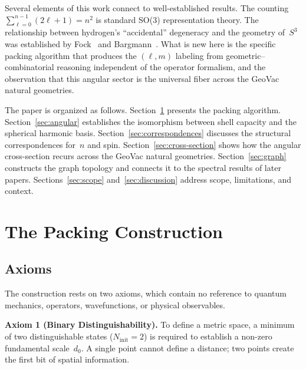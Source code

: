 \documentclass[aps,prl,reprint,amsmath,amssymb]{revtex4-2}
\begin{document}
\medskip

Several elements of this work connect to well-established results.
The counting $\sum_{\ell=0}^{n-1}(2\ell+1) = n^2$ is standard SO(3)
representation theory.  The relationship between hydrogen's
``accidental'' degeneracy and the geometry of~$S^3$ was established by
Fock~\cite{fock1935} and Bargmann~\cite{bargmann1936}.  What is new
here is the specific packing algorithm that produces the $(\ell, m)$
labeling from geometric--combinatorial reasoning independent of the
operator formalism, and the observation that this angular sector is
the universal fiber across the GeoVac natural geometries.

The paper is organized as follows.
Section~\ref{sec:construction} presents the packing algorithm.
Section~\ref{sec:angular} establishes the isomorphism between shell
capacity and the spherical harmonic basis.
Section~\ref{sec:correspondences} discusses the structural
correspondences for~$n$ and spin.
Section~\ref{sec:cross-section} shows how the angular cross-section
recurs across the GeoVac natural geometries.
Section~\ref{sec:graph} constructs the graph topology and connects it
to the spectral results of later papers.
Sections~\ref{sec:scope} and~\ref{sec:discussion} address scope,
limitations, and context.


\section{The Packing Construction}
\label{sec:construction}

\subsection{Axioms}

The construction rests on two axioms, which contain no reference to
quantum mechanics, operators, wavefunctions, or physical observables.

\medskip

\noindent\textbf{Axiom 1 (Binary Distinguishability).}
To define a metric space, a minimum of two distinguishable states
($N_{\mathrm{init}} = 2$) is required to establish a non-zero
fundamental scale~$d_0$.  A single point cannot define a distance; two
points create the first bit of spatial information.

\medskip
\end{document}
